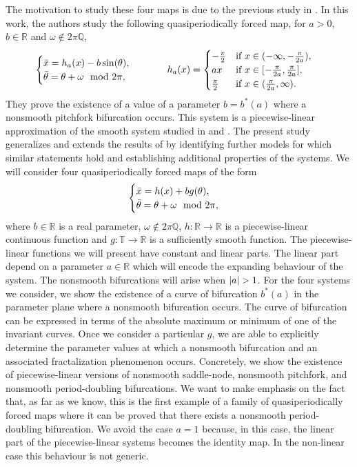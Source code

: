 \documentclass[12pt]{article}
\newcommand{\T}{\mathbb{T}}
\newcommand{\R}{\mathbb{R}}
\theoremstyle{plain}
\theoremstyle{remark}
\DeclarePairedDelimiter\abs{\lvert}{\rvert}
\theoremstyle{definition}
\begin{document}
The motivation to study these four maps is due to the previous study in \cite{jorba2024nonsmooth}. In this work, the authors study the following quasiperiodically forced map, for $a>0$, $b\in\R$ and $\omega\not\in2\pi\mathbb{Q}$,
\begin{align*}
    \begin{cases}
        \Bar{x} = h_{a}(x) - b \sin(\theta),\\
        \Bar{\theta} = \theta + \omega \mod2\pi,
    \end{cases}
    &\hspace{1cm}
    h_{a}(x)= 
    \begin{cases}
        -\frac{\pi}{2} &\text{if }x\in(-\infty,-\frac{\pi}{2a}),\\
        ax & \text{if }x\in[-\frac{\pi}{2a},\frac{\pi}{2a}],\\
        \frac{\pi}{2} &\text{if }x\in(\frac{\pi}{2a},\infty).
    \end{cases}
\end{align*}
They prove the existence of a value of a parameter $b=b^*(a)$ where a nonsmooth pitchfork bifurcation occurs. 
This system is a piecewise-linear approximation of the smooth system studied in \cite{Jorba2018Mu} and \cite{jager2009}.
The present study generalizes and extends the results of \cite{jorba2024nonsmooth} by identifying further models for which similar statements hold and establishing additional properties of the systems. We will consider four quasiperiodically forced maps of the form
\begin{align*}
    \begin{cases}
        \Bar{x} = h(x) + b g(\theta),\\
        \Bar{\theta} = \theta + \omega \mod2\pi,
    \end{cases}
\end{align*}
where $b\in\R$ is a real parameter, $\omega\not\in2\pi\mathbb{Q}$, $h\colon\R\to\R$ is a piecewise-linear continuous function and $g\colon\T\to\R$ is a sufficiently smooth function. The piecewise-linear functions we will present have constant and linear parts. The linear part depend on a parameter $a\in\R$ which will encode the expanding behaviour of the system. The nonsmooth bifurcations will arise when $\abs{a}>1$. For the four systems we consider, we show the existence of a curve of bifurcation $b^*(a)$ in the parameter plane where a nonsmooth bifurcation occurs. The curve of bifurcation can be expressed in terms of the absolute maximum or minimum of one of the invariant curves. Once we consider a particular $g$, we are able to explicitly determine the parameter values at which a nonsmooth bifurcation and an associated fractalization phenomenon occurs. 
Concretely, we show the existence of piecewise-linear versions of nonsmooth saddle-node, nonsmooth pitchfork, and nonsmooth period-doubling bifurcations. We want to make emphasis on the fact that, as far as we know, this is the first example of a family of quasiperiodically forced maps where it can be proved that there exists a nonsmooth period-doubling bifurcation. We avoid the case $a=1$ because, in this case, the linear part of the piecewise-linear systems becomes the identity map. In the non-linear case this behaviour is not generic.
\end{document}
